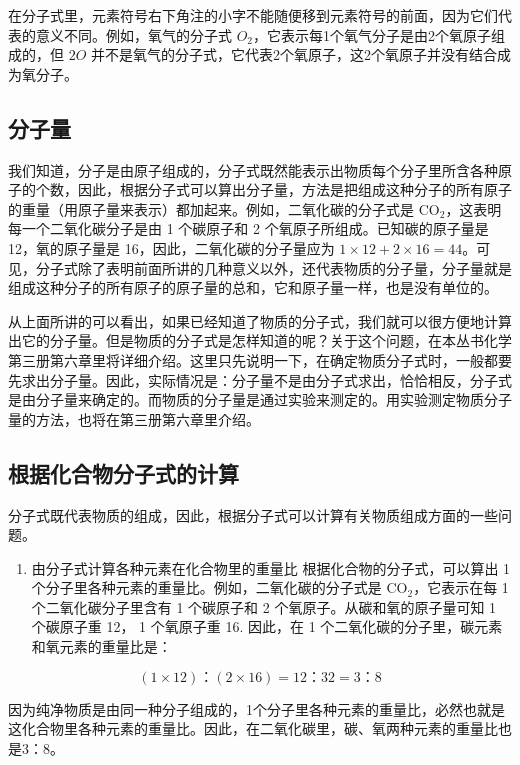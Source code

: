在分子式里，元素符号右下角注的小字不能随便移到元素符号的前面，因为它们代表的意义不同。例如，氧气的分子式
\(O_{2}\)，它表示每1个氧气分子是由2个氧原子组成的，但 \(2O\)
并不是氧气的分子式，它代表2个氧原子，这2个氧原子并没有结合成为氧分子。

\subsection{分子量}

我们知道，分子是由原子组成的，分子式既然能表示出物质每个分子里所含各种原子的个数，因此，根据分子式可以算出分子量，方法是把组成这种分子的所有原子的重量（用原子量来表示）都加起来。例如，二氧化碳的分子式是
\(\mathrm{CO}_{2}\)，这表明每一个二氧化碳分子是由 1 个碳原子和 2
个氧原子所组成。已知碳的原子量是 12，氧的原子量是
16，因此，二氧化碳的分子量应为
\(1 \times 12 + 2 \times 16 = 44\)。可见，分子式除了表明前面所讲的几种意义以外，还代表物质的分子量，分子量就是组成这种分子的所有原子的原子量的总和，它和原子量一样，也是没有单位的。

从上面所讲的可以看出，如果已经知道了物质的分子式，我们就可以很方便地计算出它的分子量。但是物质的分子式是怎样知道的呢？关于这个问题，在本丛书化学第三册第六章里将详细介绍。这里只先说明一下，在确定物质分子式时，一般都要先求出分子量。因此，实际情况是：分子量不是由分子式求出，恰恰相反，分子式是由分子量来确定的。而物质的分子量是通过实验来测定的。用实验测定物质分子量的方法，也将在第三册第六章里介绍。

\subsection{根据化合物分子式的计算}

分子式既代表物质的组成，因此，根据分子式可以计算有关物质组成方面的一些问题。

\begin{enumerate}
\item
  由分子式计算各种元素在化合物里的重量比 根据化合物的分子式，可以算出 1
  个分子里各种元素的重量比。例如，二氧化碳的分子式是
  \(\mathrm{CO}_{2}\)，它表示在每 1 个二氧化碳分子里含有 1 个碳原子和 2
  个氧原子。从碳和氧的原子量可知 1 个碳原子重 12， 1 个氧原子重 16.
  因此，在 1 个二氧化碳的分子里，碳元素和氧元素的重量比是：
\end{enumerate}

\[
(1 \times 12)\text{：} (2 \times 16) = 12\text{：} 32 = 3\text{：} 8
\]

因为纯净物质是由同一种分子组成的，1个分子里各种元素的重量比，必然也就是这化合物里各种元素的重量比。因此，在二氧化碳里，碳、氧两种元素的重量比也是3：8。


